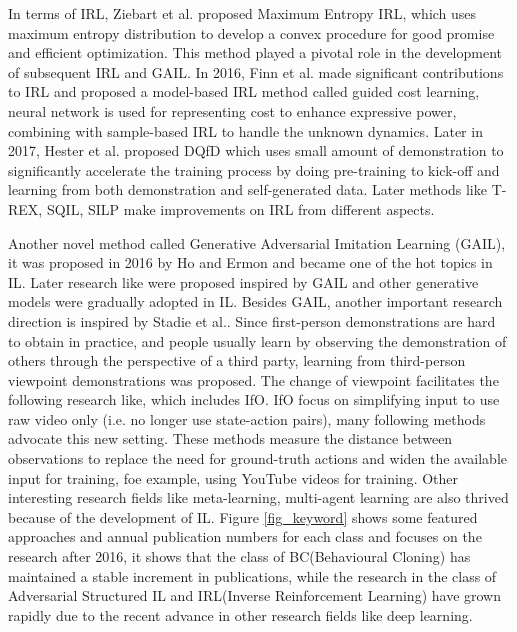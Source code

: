 \documentclass[acmsmall]{acmart}
\begin{document}
In terms of IRL, Ziebart et al.\cite{ziebart2008maximum} proposed Maximum Entropy IRL, which uses maximum entropy distribution to develop a convex procedure for good promise and efficient optimization. This method played a pivotal role in the development of subsequent IRL and GAIL. In 2016, Finn et al.\cite{finnGuidedCostLearning2016} made significant contributions to IRL and proposed a model-based IRL method called guided cost learning, neural network is used for representing cost to enhance expressive power, combining with sample-based IRL to handle the unknown dynamics. Later in 2017, Hester et al. proposed DQfD\cite{hesterDeepQlearningDemonstrations2017} which uses small amount of demonstration to significantly accelerate the training process by doing pre-training to kick-off and learning from both demonstration and self-generated data. Later methods like T-REX\cite{brownExtrapolatingSuboptimalDemonstrations2019}, SQIL\cite{reddySQILImitationLearning2019}, SILP\cite{luo2021self} make improvements on IRL from different aspects.

Another novel method called Generative Adversarial Imitation Learning (GAIL), it was proposed in 2016 by Ho and Ermon\cite{hoGenerativeAdversarialImitation2016} and became one of the hot topics in IL. Later research like\cite{wangRobustImitationDiverse2017,stadieThirdPersonImitationLearning2017,dingGoalconditionedImitationLearning2019,kinoseIntegrationImitationLearning2020} were proposed inspired by GAIL and other generative models were gradually adopted in IL. Besides GAIL, another important research direction is inspired by Stadie et al.\cite{stadieThirdPersonImitationLearning2017}. Since first-person demonstrations are hard to obtain in practice, and people usually learn by observing the demonstration of others through the perspective of a third party, learning from third-person viewpoint demonstrations was proposed. The change of viewpoint facilitates the following research like\cite{edwardsImitatingLatentPolicies2019,brownExtrapolatingSuboptimalDemonstrations2019}, which includes IfO\cite{liuImitationObservationLearning2018}. IfO focus on simplifying input to use raw video only (i.e. no longer use state-action pairs), many following methods advocate this new setting. These methods measure the distance between observations to replace the need for ground-truth actions and widen the available input for training, foe example, using YouTube videos for training\cite{aytarPlayingHardExploration2018}. Other interesting research fields like meta-learning\cite{finnModelAgnosticMetaLearningFast2017,duanOneShotImitationLearning2017,huTwoStageModelAgnosticMetaLearning2020}, multi-agent learning\cite{zhanGeneratingMultiAgentTrajectories2019} are also thrived because of the development of IL. Figure \ref{fig_keyword} shows some featured approaches and annual publication numbers for each class and focuses on the research after 2016, it shows that the class of BC(Behavioural Cloning) has maintained a stable increment in publications, while the research in the class of Adversarial Structured IL and IRL(Inverse Reinforcement Learning) have grown rapidly due to the recent advance in other research fields like deep learning.
\end{document}
